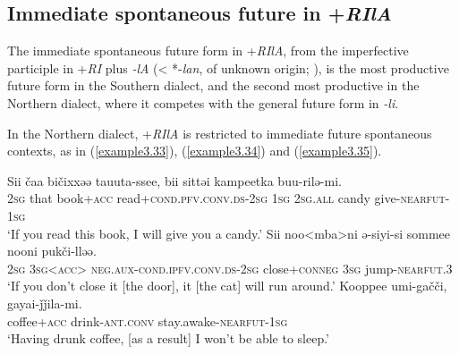 \documentclass[output=paper,colorlinks,citecolor=brown]{langscibook}
\begin{document}
\subsection{Immediate spontaneous future in +\textit{RIlA}}\label{Section3.5.1}

The immediate spontaneous future form in +\textit{RIlA}, from the imperfective participle in +\textit{RI} plus \textit{-lA} (< *-\textit{lan}, of unknown origin; \citealt{Pevnov_2016}), is the most productive future form in the Southern dialect, and the second most productive in the Northern dialect, where it competes with the general future form in \textit{-li}.


In the Northern dialect, +\textit{RIlA} is restricted to immediate future spontaneous contexts, as in (\ref{example3.33}), (\ref{example3.34}) and (\ref{example3.35}).

\ea
\label{example3.33}
\gll Sii	čaa	bičixxəə		tauuta-ssee,					bii	sittəi	kampeetka buu-rilə-mi.\\
    	\textsc{2sg}	that	book+\textsc{acc}	read+\textsc{cond}.\textsc{pfv}.\textsc{conv}.\textsc{ds}-\textsc{2sg}	\textsc{1sg}	\textsc{2sg}.\textsc{all}	candy
	give-\textsc{nearfut}-\textsc{1sg}\\
\glt `If you read this book, I will give you a candy.’
\ex
\label{example3.34}
\gll Sii	noo<mba>ni		ə-siyi-si							sommee			nooni pukči-lləə.\\
    	\textsc{2sg}	\textsc{3sg}<\textsc{acc}>		\textsc{neg}.\textsc{aux}-\textsc{cond}.\textsc{ipfv}.\textsc{conv}.\textsc{ds}-\textsc{2sg}	close+\textsc{conneg}	\textsc{3sg}
		jump-\textsc{nearfut.3}\\
\glt `If you don’t close it [the door], it [the cat] will run around.’
\ex
\label{example3.35}
\gll Kooppee		umi-gačči,		gayai-ǰǰila-mi.\\
    	coffee+\textsc{acc}	drink-\textsc{ant}.\textsc{conv}	stay.awake-\textsc{nearfut}-\textsc{1sg}\\
\glt `Having drunk coffee, [as a result] I won’t be able to sleep.’
\z
	
\end{document}
